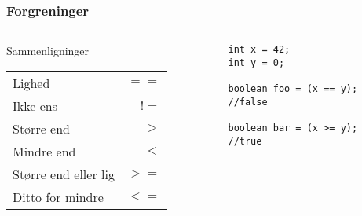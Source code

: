 \documentclass{beamer}
\begin{document}
\begin{frame}[fragile]
  \frametitle{Forgreninger}
  \begin{columns}
    \begin{column}{0.5\textwidth}
      \begin{block}{Sammenligninger}
        \begin{table}[h]
          \centering
          \begin{tabular}{lr}
            \hline
            Lighed & $==$ \\
            Ikke ens & $!=$\\
            Større end & $> $\\
            Mindre end & $<$\\
            Større end eller lig & $>=$\\
            Ditto for mindre & $<=$\\
            
          \end{tabular}
        \end{table}
      \end{block}
    \end{column}
    \begin{column}{0.5\textwidth}
\begin{verbatim} 
int x = 42;
int y = 0;

boolean foo = (x == y);
//false

boolean bar = (x >= y);
//true

\end{verbatim}
    \end{column}
  \end{columns}
\end{frame}
\end{document}
